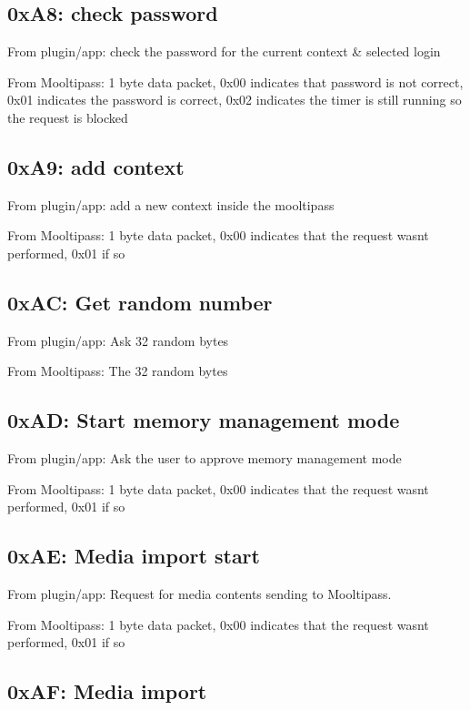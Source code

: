 \subsection*{0x\+A8\+: check password }

From plugin/app\+: check the password for the current context \& selected login

From Mooltipass\+: 1 byte data packet, 0x00 indicates that password is not correct, 0x01 indicates the password is correct, 0x02 indicates the timer is still running so the request is blocked

\subsection*{0x\+A9\+: add context }

From plugin/app\+: add a new context inside the mooltipass

From Mooltipass\+: 1 byte data packet, 0x00 indicates that the request wasn\textquotesingle{}t performed, 0x01 if so

\subsection*{0x\+AC\+: Get random number }

From plugin/app\+: Ask 32 random bytes

From Mooltipass\+: The 32 random bytes

\subsection*{0x\+AD\+: Start memory management mode }

From plugin/app\+: Ask the user to approve memory management mode

From Mooltipass\+: 1 byte data packet, 0x00 indicates that the request wasn\textquotesingle{}t performed, 0x01 if so

\subsection*{0x\+AE\+: Media import start }

From plugin/app\+: Request for media contents sending to Mooltipass.

From Mooltipass\+: 1 byte data packet, 0x00 indicates that the request wasn\textquotesingle{}t performed, 0x01 if so

\subsection*{0x\+AF\+: Media import }

